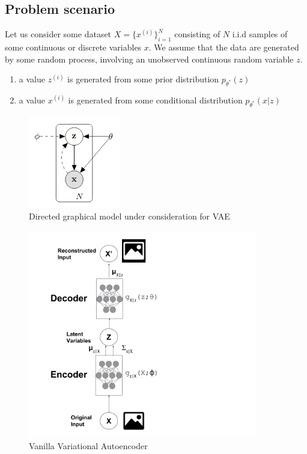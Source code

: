 \documentclass[a3paper, 12pt]{book} %
\begin{document}
\subsection{Problem scenario}
Let us consider some dataset $X=\{x^{(i)}\}_{i=1}^{N}$ consisting of $N$ i.i.d samples of some continuous or discrete variables $x$. We assume that the data are generated by some random process, involving an unobserved continuous random variable $z$.
\begin{enumerate}
	\item a value $z^{(i)}$ is generated from some prior distribution $p_{\theta^{*}}(z)$
	\item a value $x^{(i)}$ is generated from some conditional distribution $p_{\theta^{*}}(x|z)$
\end{enumerate}
\begin{figure}[htpb]
	\centering
	\includegraphics[width=4cm]{figures/vae_gm.png}
	\caption{Directed graphical model under consideration for VAE}
	\label{fig:boat1}
\end{figure}




\begin{figure}[htpb]
	\centering
	\includegraphics[width=10cm]{figures/vanilla_vae.png}
	\caption{Vanilla Variational Autoencoder}
	\label{fig:boat1}
\end{figure}
\end{document}
